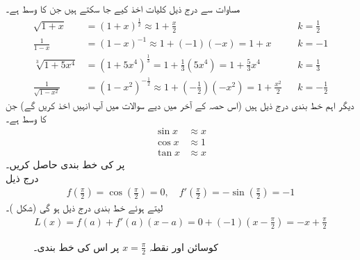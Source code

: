 مساوات  سے درج ذیل کلیات اخذ کیے جا سکتے ہیں جن کا وسط  ہے۔
\begin{align*}
\sqrt{1+x}&=(1+x)^{\tfrac{1}{2}}\approx 1+\frac{x}{2}&& k=\frac{1}{2}\\
\frac{1}{1-x}&=(1-x)^{-1}\approx 1+(-1)(-x)=1+x&&k=-1\\
\sqrt[3]{1+5x^4}&=(1+5x^4)^{\tfrac{1}{3}}=1+\frac{1}{3}(5x^4)=1+\frac{5}{3}x^4&&k=\frac{1}{3}\\
\frac{1}{\sqrt{1-x^2}}&=(1-x^2)^{-\tfrac{1}{2}}\approx 1+(-\tfrac{1}{2})(-x^2)=1+\frac{x^2}{2}&&k=-\frac{1}{2}
\end{align*}
دیگر اہم خط بندی درج ذیل ہیں (اس حصہ کے آخر میں دیے سوالات میں  آپ انہیں اخذ کریں گے) جن کا وسط  ہے۔
\begin{align*}
\sin x&\approx x\\
\cos x&\approx 1\\
\tan x&\approx x
\end{align*}
 پر  کی خط بندی حاصل کریں۔\\
درج ذیل
\begin{align*}
f(\tfrac{\pi}{2})=\cos(\tfrac{\pi}{2})=0,\quad f'(\tfrac{\pi}{2})=-\sin(\tfrac{\pi}{2})=-1
\end{align*}
لیتے ہوئے خط بندی درج ذیل ہو گی (شکل )۔
\begin{align*}
L(x)=f(a)+f'(a)(x-a)=0+(-1)(x-\tfrac{\pi}{2})=-x+\tfrac{\pi}{2}
\end{align*}
\begin{figure}
\centering
{}
\caption{کوسائن اور نقطہ $x=\tfrac{\pi}{2}$ پر اس کی خط بندی۔}
\label{شکل_مثال_استعمال_خطی_تخمین_کوسائن}
\end{figure}

